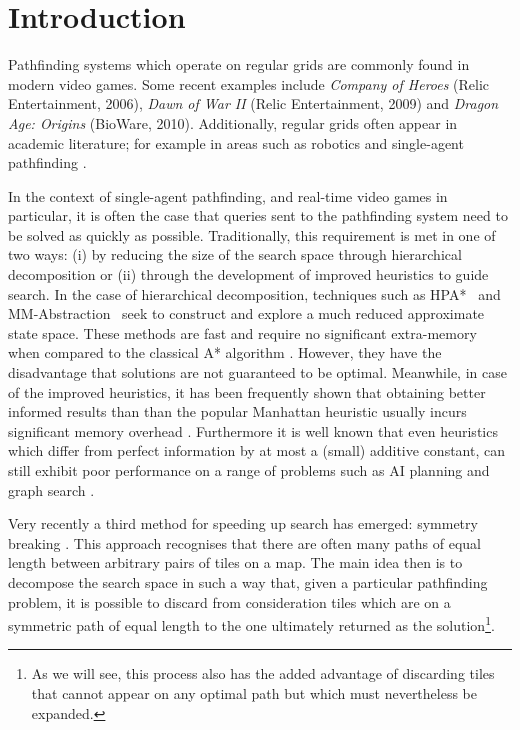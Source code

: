 \section{Introduction}
Pathfinding systems which operate on regular grids are commonly found in modern video games.
Some recent examples include \emph{Company of Heroes} (Relic Entertainment, 2006), \emph{Dawn of War II} (Relic
Entertainment, 2009) and \emph{Dragon Age: Origins} (BioWare, 2010).
Additionally, regular grids often appear in academic literature; for example in areas such as robotics \cite{choset05} and
single-agent pathfinding \cite{botea04,bjornsson06,sturtevant07}.
\par
In the context of single-agent pathfinding, and real-time video games in particular, it is often the case that queries sent to
the pathfinding system  need to be solved as quickly as possible.
Traditionally, this requirement is met in one of two ways: (i) by reducing the size of the search space through hierarchical 
decomposition or (ii) through the development of improved heuristics to guide search.
In the case of hierarchical decomposition, techniques such as
HPA*~\cite{botea04} and MM-Abstraction~\cite{sturtevant07} seek to construct and explore
a much reduced approximate state space.
These methods are fast and require no significant extra-memory when compared to the classical
A* algorithm \cite{hart68}.
However, they have the disadvantage that solutions are not guaranteed to be optimal.
Meanwhile, in case of the improved heuristics, it has been frequently shown
that obtaining better informed results than than the popular
Manhattan heuristic usually incurs significant memory overhead 
\cite{sturtevant09,goldberg05,Cazenave:06,bjornsson06}.
Furthermore it is well known that even heuristics which differ from perfect information 
by at most a (small) additive constant, can still exhibit poor performance on a range of 
problems such as AI planning and graph search \cite{helmert08,pohl77}.
\par
Very recently a third method for speeding up search has emerged: symmetry
breaking \cite{bjornsson06,pochter10,harabor10}.
This approach recognises that there are often many paths of equal length between arbitrary pairs of tiles on a map.
The main idea then is to decompose the search space in such a way that, given a particular pathfinding problem, it is possible to
discard from consideration tiles which are on a symmetric path of equal length to the one ultimately returned 
as the solution\footnote{
As we will see, this process also has the added advantage of discarding tiles 
that cannot appear on any optimal path but which must nevertheless be expanded.}.
